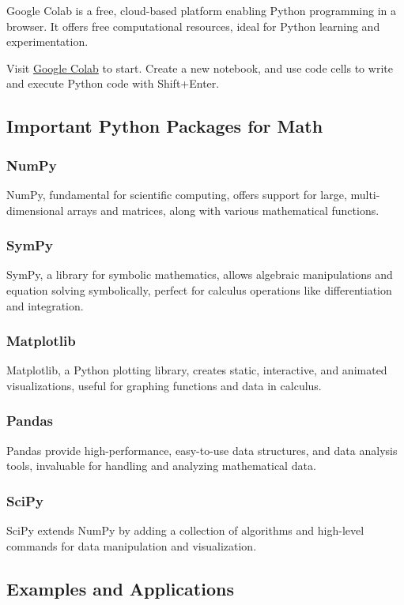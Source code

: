 \documentclass[a4paper,12pt]{book}
\begin{document}
Google Colab is a free, cloud-based platform enabling Python programming in a browser. It offers free computational resources, ideal for Python learning and experimentation.

Visit \href{https://colab.research.google.com/}{Google Colab} to start. Create a new notebook, and use code cells to write and execute Python code with Shift+Enter.

\subsection*{Important Python Packages for Math}

\subsubsection*{NumPy}
NumPy, fundamental for scientific computing, offers support for large, multi-dimensional arrays and matrices, along with various mathematical functions.

\subsubsection*{SymPy}
SymPy, a library for symbolic mathematics, allows algebraic manipulations and equation solving symbolically, perfect for calculus operations like differentiation and integration.

\subsubsection*{Matplotlib}
Matplotlib, a Python plotting library, creates static, interactive, and animated visualizations, useful for graphing functions and data in calculus.

\subsubsection*{Pandas}
Pandas provide high-performance, easy-to-use data structures, and data analysis tools, invaluable for handling and analyzing mathematical data.

\subsubsection*{SciPy}
SciPy extends NumPy by adding a collection of algorithms and high-level commands for data manipulation and visualization.

\subsection*{Examples and Applications}
\end{document}
